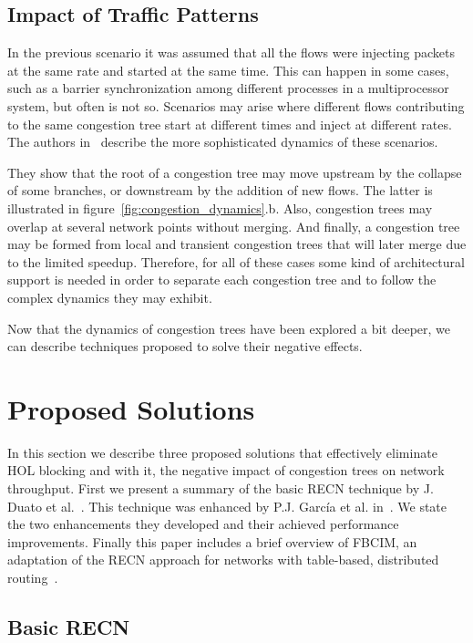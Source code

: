 \documentclass[12pt]{article}
\begin{document}
\subsection{Impact of Traffic Patterns}\label{S:traffic_patterns}

In the previous scenario it was assumed that all the flows were injecting packets at the same rate and started at the same time. This can happen in some cases, such as a barrier synchronization among different processes in a multiprocessor system, but often is not so. Scenarios may arise where different flows contributing to the same congestion tree start at different times and inject at different rates. The authors in~\cite{paper1} describe the more sophisticated dynamics of these scenarios.

They show that the root of a congestion tree may move upstream by the collapse of some branches, or downstream by the addition of new flows. The latter is illustrated in figure~\ref{fig:congestion_dynamics}.b. Also, congestion trees may overlap at several network points without merging. And finally, a congestion tree may be formed from local and transient congestion trees that will later merge due to the limited speedup. Therefore, for all of these cases some kind of architectural support is needed in order to separate each congestion tree and to follow the complex dynamics they may exhibit. 

Now that the dynamics of congestion trees have been explored a bit deeper, we can describe techniques proposed to solve their negative effects.

\section{Proposed Solutions}\label{S:solutions}

In this section we describe three proposed solutions that effectively eliminate HOL blocking and with it, the negative impact of congestion trees on network throughput. First we present a summary of the basic RECN technique by J. Duato et al.~\cite{paper2}. This technique was enhanced by P.J. Garc\'ia et al. in~\cite{paper1}. We state the two enhancements they developed and their achieved performance improvements. Finally this paper includes a brief overview of FBCIM, an adaptation of the RECN approach for networks with table-based, distributed routing~\cite{paper3}. 

\subsection{Basic RECN}\label{S:basic_recn}
\end{document}
